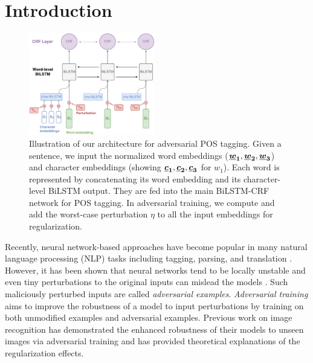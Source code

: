 \documentclass[11pt,a4paper]{article}
\newcommand{\veci}[1]{\mbox{\boldmath $#1$}}
\begin{document}
\section{Introduction}
\begin{figure}[!h]
    \hspace{-3mm}
    \centering
    \includegraphics[width=0.49\textwidth]{pic_adv_model.pdf}
    \caption{Illustration of our architecture for adversarial POS tagging.
    Given a sentence, we input the normalized word embeddings ($\veci{\uline{w}_1}, \veci{\uline{w}_2}, \veci{\uline{w}_3}$) and character embeddings (showing $\veci{\uline{c}_1}, \veci{\uline{c}_2}, \veci{\uline{c}_3}$ for $w_1$). 
    Each word is represented by concatenating its word embedding and 
    its character-level BiLSTM output.
    They are fed into the main BiLSTM-CRF network for POS tagging.
    In adversarial training, we compute and add the worst-case perturbation $\eta$ to all the input embeddings for regularization.
    }
    \label{fig:adv_pic}
\vspace{-4mm}
\end{figure}

 
Recently, neural network-based approaches have become popular in many natural language processing (NLP) tasks including tagging, parsing, and translation \cite{chen2014fast,bahdanau2014neural,ma-hovy:2016:P16-1}.
However, it has been shown that neural networks tend to be locally unstable
and
even tiny perturbations to the original inputs can mislead the models \cite{Szegedy2013}. Such maliciously perturbed inputs are called {\it adversarial examples}.
{\it Adversarial training} \cite{Goodfellow2015explain} aims to improve the robustness of a model to input perturbations by training on both unmodified examples and adversarial examples.
Previous work \cite{Goodfellow2015explain,shaham2015understanding} on image recognition 
has demonstrated the enhanced robustness of their models to unseen images via adversarial training and
has provided theoretical explanations of
the regularization effects.
\end{document}
